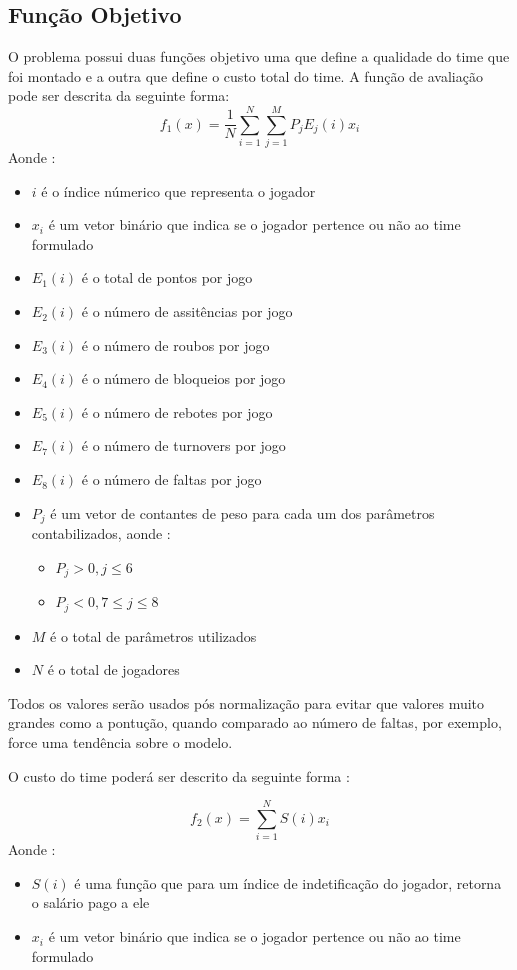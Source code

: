 \subsection{Função Objetivo}
O problema possui duas funções objetivo uma que define a qualidade do time que foi montado e a outra que define o custo total 
do time. A função de avaliação pode ser descrita da seguinte forma:
\begin{equation}
    f_{1}(x) = \frac{1}{N}\sum_{i=1}^{N}\sum_{j=1}^{M}P_{j}E_{j}(i)x_i
\end{equation}
Aonde :
\begin{itemize}
    \item \(i\) é o índice númerico que representa o jogador
    \item \(x_i\) é um vetor binário que indica se o jogador pertence ou não ao time formulado
    \item \(E_1(i)\) é o total de pontos por jogo
    \item \(E_2(i)\) é o número de assitências por jogo
    \item \(E_3(i)\) é o número de roubos por jogo 
    \item \(E_4(i)\) é o número de bloqueios por jogo 
    \item \(E_5(i)\) é o número de rebotes por jogo
    \item \(E_7(i)\) é o número de turnovers por jogo
    \item \(E_8(i)\) é o número de faltas por jogo
    \item \(P_{j}\) é um vetor de contantes de peso para cada um dos parâmetros contabilizados, aonde :
    \begin{itemize}
        \item \(P_{j} > 0, j \leq 6 \)
        \item \(P_{j} < 0, 7 \leq j \leq 8\)
    \end{itemize}
    \item \(M\) é o total de parâmetros utilizados
    \item \(N\) é o total de jogadores
\end{itemize}

Todos os valores serão usados pós normalização para evitar que valores muito grandes como a pontução, quando comparado ao número de faltas, por exemplo,
force uma tendência sobre o modelo.

O custo do time poderá ser descrito da seguinte forma :

\begin{equation}
    f_2(x) = \sum_{i=1}^{N}S(i)x_i
\end{equation}
Aonde :
\begin{itemize}
    \item \(S(i)\) é uma função que para um índice de indetificação do jogador, retorna o salário pago a ele
    \item \(x_i\) é um vetor binário que indica se o jogador pertence ou não ao time formulado
\end{itemize}
